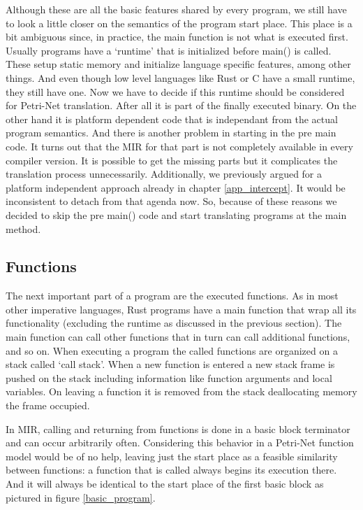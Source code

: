 Although these are all the basic features shared by every program, we still have to look a little closer on the semantics of the program start place.
This place is a bit ambiguous since, in practice, the main function is not what is executed first.
Usually programs have a `runtime' that is initialized before main() is called.
These setup static memory and initialize language specific features, among other things.
And even though low level languages like Rust or C have a small runtime, they still have one.
Now we have to decide if this runtime should be considered for Petri-Net translation.
After all it is part of the finally executed binary.
On the other hand it is platform dependent code that is independant from the actual program semantics.
And there is another problem in starting in the pre main code.
It turns out that the MIR for that part is not completely available in every compiler version.
It is possible to get the missing parts but it complicates the translation process unnecessarily.
Additionally, we previously argued for a platform independent approach already in chapter \ref{app_intercept}.
It would be inconsistent to detach from that agenda now.
So, because of these reasons we decided to skip the pre main() code and start translating programs at the main method.

\subsection{Functions}
The next important part of a program are the executed functions.
As in most other imperative languages, Rust programs have a main function that wrap all its functionality (excluding the runtime as discussed in the previous section).
The main function can call other functions that in turn can call additional functions, and so on.
When executing a program the called functions are organized on a stack called `call stack'.
When a new function is entered a new stack frame is pushed on the stack including information like function arguments and local variables.
On leaving a function it is removed from the stack deallocating memory the frame occupied.

In MIR, calling and returning from functions is done in a basic block terminator and can occur arbitrarily often.
Considering this behavior in a Petri-Net function model would be of no help, leaving just the start place as a feasible similarity between functions:
a function that is called always begins its execution there.
And it will always be identical to the start place of the first basic block as pictured in figure \ref{basic_program}.

